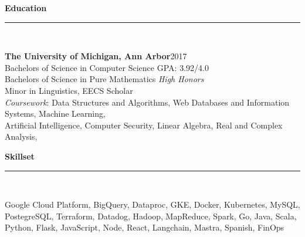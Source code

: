 \documentclass[a4paper,10pt]{article}
\newcommand{\horizontalline}{{\rule{533pt}{0.625pt}\\}}
\renewcommand{\section}[1]{{\noindent\textbf{\large #1}\\\horizontalline}}
\renewcommand{\subsection}[2]{{\noindent \textbf{#1}\hfill \textsc{#2}\\}}
\begin{document}
\section{Education}
\subsection{The University of Michigan, Ann Arbor} {2017}
Bachelors of Science in Computer Science \hfill \normalsize \textsc{GPA}: 3.92/4.0\\
Bachelors of Science in Pure Mathematics \hfill \normalsize \textit{High Honors}\\
Minor in Linguistics, EECS Scholar\\
\textit{Coursework}: Data Structures and Algorithms, Web Databases and Information Systems, Machine Learning,\\
\hphantom{Coursework:::}Artificial Intelligence, Computer Security, Linear Algebra,
Real and Complex Analysis,\\

\section{Skillset}
Google Cloud Platform, BigQuery, Dataproc, GKE, Docker, Kubernetes, MySQL, PostegreSQL, Terraform, Datadog, Hadoop, MapReduce, Spark, Go, Java, Scala, Python, Flask, JavaScript, Node, React, Langchain, Mastra, Spanish, FinOps\\
\end{document}
